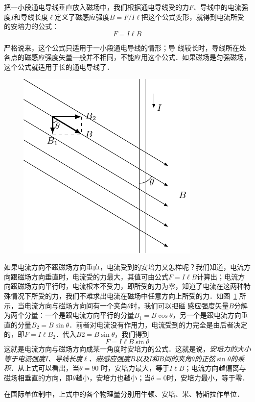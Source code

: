 把一小段通电导线垂直放入磁场中，我们根据通电导线受的力$F$、导线中的电流强度$I$和导线长度$\ell$定义了磁感应强度$B=F/I\ell$把这个公式变形，就得到电流所受的安培力的公式：
\[F=I\ell B\]

严格说来，这个公式只适用于一小段通电导线的情形；导
线较长时，导线所在处各点的磁感应强度矢量一般并不相同，不能应用这个公式．如果磁场是匀强磁场，这个公式就适用于长的通电导线了．
\begin{figure}[htbp]
    \centering
    \includegraphics{fig/C/1-21.pdf}
    \caption{}\label{fig_C_1-21}
\end{figure}

如果电流方向不跟磁场方向垂直，电流受到的安培力又怎样呢？我们知道，电流方向跟磁场方向垂直时，电流受的力最大，其值可由公式$F=I\ell B$计算出；电流方向跟磁场方向平行时，电流根本不受力，即所受的力为零，知道了电流在这两种特殊情况下所受的力，我们不难求出电流在磁场中任意方向上所受的力．如图~\ref{fig_C_1-21} 所示，当电流方向与磁场方向间有一个夹角$\theta$时，我们可以把磁
感应强度矢量$B$分解为两个分量：一个是跟电流方向平行的分量$B_1=B\cos\theta$，另一个是跟电流方向垂直的分量$B_2=B\sin\theta$．前者对电流没有作用力，电流受到的力完全是由后者决定的，即$F=I\ell B_2$．代入$B2=B\sin\theta$，我们得到
\[F=I\ell B\sin\theta\]
这就是电流方向与磁场方向成某一角度时安培力的公式．这就是说，\textit{安培力的大小等于电流强度$I$、导线长度$\ell$、磁感应强度$B$以及$I$和$B$间的夹角$\theta$的正弦$\sin\theta$的乘积}．从上式可以看出，当$\theta =90^{\circ}$时，安培力最大，等于$I\ell B$；电流方向越偏离与磁场相垂直的方向，即$\theta$越小，安培力也越小；当$\theta =0$时，安培力最小，等于零．

在国际单位制中，上式中的各个物理量分别用牛顿、安培、米、特斯拉作单位．

